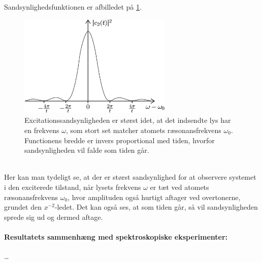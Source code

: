 Sandsynlighedsfunktionen er afbilledet på \cref{fig:Q03_ExcitationProbabilityFunction}.
\begin{figure}[!h]
    \centering
    \includegraphics[width=0.65\textwidth]{Q03/images/ExcitationProbabilityFunction.PNG}
    \caption{Excitationssandsynligheden er størst idet, at det indsendte lys har en frekvens $\omega$, som stort set matcher atomets ræsonansfrekvens $\omega_0$. Functionens bredde er invers proportional med tiden, hvorfor sandsynligheden vil falde som tiden går.}
    \label{fig:Q03_ExcitationProbabilityFunction}
\end{figure}\\
%
Her kan man tydeligt se, at der er størst sandsynlighed for at observere systemet i den exciterede tilstand, når lysets frekvens $\omega$ er tæt ved atomets ræsonansfrekvens $\omega_0$, hvor amplituden også hurtigt aftager ved overtonerne, grundet den $x^{-2}$-ledet. Det kan også ses, at som tiden går, så vil sandsynligheden sprede sig ud og dermed aftage.


\paragraph{Resultatets sammenhæng med spektroskopiske eksperimenter:} \ldots